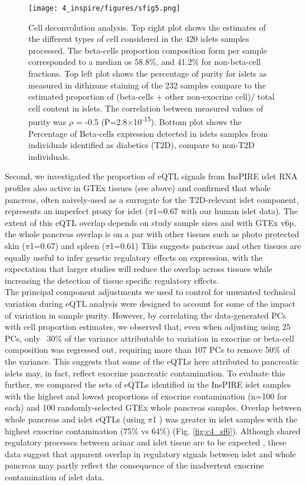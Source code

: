 \begin{figure}
    \centering
    \texttt{[image: 4\_inspire/figures/sfig5.png]}
    \caption[Cell deconvolution anlaysis]{Cell deconvolution analysis. Top right plot shows the estimates of the different types of cell considered in the 420 islets samples processed. The beta-cells proportion composition form per sample corresponded to a median os 58.8\%, and 41.2\% for non-beta-cell fractions. Top left plot shows the percentage of purity for islets as measured in dithizone staining of the 232 samples compare to the estimated proportion of (beta-cells +  other non-exocrine cell)/ total cell content in islets. The correlation between measured values of purity was $\rho$ = -0.5 (P=2.8$\times$10\textsuperscript{-15}). Bottom plot shows the Percentage of Beta-cells expression detected in islets samples from individuals identified as diabetics (T2D), compare to non-T2D individuals.}
    \label{fig:c4_sf5}
  \end{figure}
  
Second, we investigated the proportion of eQTL signals from InsPIRE islet RNA profiles also active in GTEx tissues (see above) and confirmed that whole pancreas, often naively-used as a surrogate for the T2D-relevant islet component, represents an imperfect proxy for islet ($\pi$1=0.67 with our human islet data). The extent of this eQTL overlap depends on study sample sizes and with GTEx v6p, the whole pancreas overlap is on a par with other tissues such as photo protected skin ($\pi$1=0.67) and spleen ($\pi$1=0.61) This suggests pancreas and other tissues are equally useful to infer genetic regulatory effects on expression, with the expectation that larger studies will reduce the overlap across tissues while increasing the detection of tissue specific regulatory effects. \\
      
The principal component adjustments we used to control for unwanted technical variation during eQTL analysis were designed to account for some of the impact of variation in sample purity. However, by correlating the data-generated PCs with cell proportion estimates, we observed that, even when adjusting using 25 PCs, only ~30\% of the variance attributable to variation in exocrine or beta-cell composition was regressed out, requiring more than 107 PCs to remove 50\% of the variance. This suggests that some of the eQTLs here attributed to pancreatic islets may, in fact, reflect exocrine pancreatic contamination. To evaluate this further, we compared the sets of eQTLs identified in the InsPIRE islet samples with the highest and lowest proportions of exocrine contamination (n=100 for each) and 100 randomly-selected GTEx whole pancreas samples. Overlap between whole pancreas and islet eQTLs (using $\pi$1 \cite{storeyDirectApproachFalse2002}) was greater in islet samples with the highest exocrine contamination (75\% vs 64\%) (Fig. \ref{fig:c4_sf6}). Although shared regulatory processes between acinar and islet tissue are to be expected \cite{solimenaSystemsBiologyIMIDIA2018}, these data suggest that apparent overlap in regulatory signals between islet and whole pancreas may partly reflect the consequence of the inadvertent exocrine contamination of islet data. 

